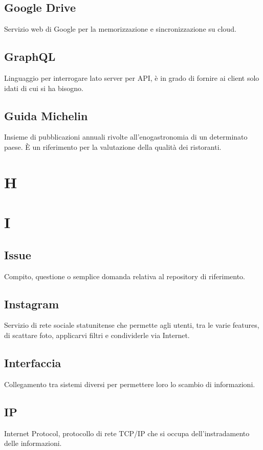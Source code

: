 \documentclass{classes/base}
\begin{document}
        \subsection*{Google Drive}
        Servizio web di Google per la memorizzazione e sincronizzazione su cloud.

        \subsection*{GraphQL}
        Linguaggio per interrogare lato server per API, è in grado di fornire ai client solo idati di cui si ha bisogno.

        \subsection*{Guida Michelin} 
        Insieme di pubblicazioni annuali rivolte all'enogastronomia di un determinato paese. È un riferimento per la valutazione della qualità dei ristoranti.
        \newpage  
    \section{H}
    \newpage  
    \section{I}
        \subsection*{Issue}
        Compito, questione o semplice domanda relativa al repository di riferimento.
        
        \subsection*{Instagram}
        Servizio di rete sociale statunitense che permette agli utenti, tra le varie features, di scattare foto, applicarvi filtri e condividerle via Internet.
        
        \subsection*{Interfaccia}
        Collegamento tra sistemi diversi per permettere loro lo scambio di informazioni.

        \subsection*{IP}
        Internet Protocol, protocollo di rete TCP/IP che si occupa dell'instradamento delle informazioni.
\end{document}
